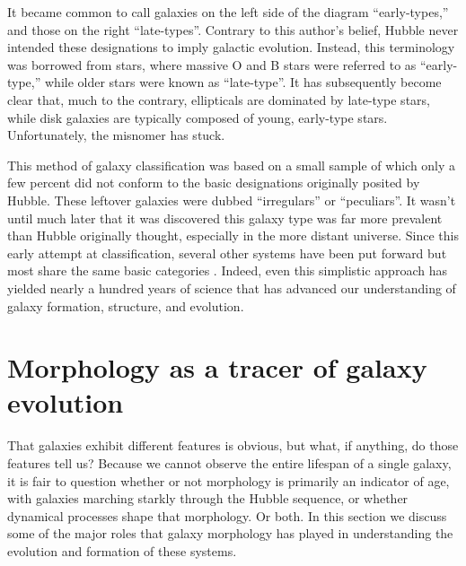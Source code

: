 It became common to call galaxies on the left side of the diagram ``early-types,'' and those on the right ``late-types''. Contrary to this author's belief, Hubble never intended these designations to imply galactic evolution. Instead, this terminology was borrowed from stars, where massive O and B stars were referred to as ``early-type,'' while older stars were known as ``late-type''\citep{Buta2011}. It has subsequently become clear that, much to the contrary, ellipticals are dominated by late-type stars, while disk galaxies are typically composed of young, early-type stars.  Unfortunately, the misnomer has stuck. 


This method of galaxy classification was based on a small sample of which only a few percent did not conform to the basic designations originally posited by Hubble. These leftover galaxies were dubbed ``irregulars'' or ``peculiars''. It wasn't until much later that it was discovered this galaxy type was far more prevalent than Hubble originally thought, especially in the more distant universe. Since this early attempt at classification, several other systems have been put forward but most share the same basic categories \citep[e.g.,][]{deVaucouleurs1959, Conselice2006}. Indeed, even this simplistic approach has yielded nearly a hundred years of science that has advanced our understanding of galaxy formation, structure, and evolution. 
 

\section{Morphology as a tracer of galaxy evolution}

That galaxies exhibit different features is obvious, but what, if anything, do those features tell us? Because we cannot observe the entire lifespan of a single galaxy, it is fair to question whether or not morphology is primarily an indicator of age, with galaxies marching starkly through the Hubble sequence, or whether dynamical processes shape that morphology. Or both. In this section we discuss some of the major roles that galaxy morphology has played in understanding the evolution and formation of these systems. 



